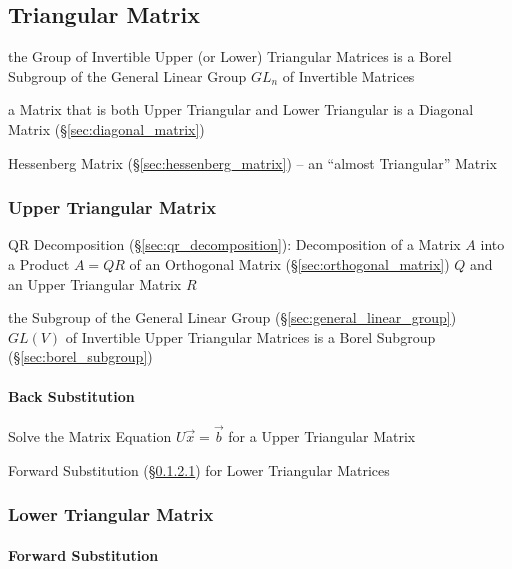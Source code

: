\subsection{Triangular Matrix}\label{sec:triangular_matrix}

the Group of Invertible Upper (or Lower) Triangular Matrices is a Borel
Subgroup of the General Linear Group $GL_n$ of Invertible Matrices

a Matrix that is both Upper Triangular and Lower Triangular is a Diagonal
Matrix (\S\ref{sec:diagonal_matrix})

\fist Hessenberg Matrix (\S\ref{sec:hessenberg_matrix}) -- an ``almost
Triangular'' Matrix



\subsubsection{Upper Triangular Matrix}\label{sec:upper_triangular}

QR Decomposition (\S\ref{sec:qr_decomposition}): Decomposition of a Matrix $A$
into a Product $A = QR$ of an Orthogonal Matrix (\S\ref{sec:orthogonal_matrix})
$Q$ and an Upper Triangular Matrix $R$

the Subgroup of the General Linear Group (\S\ref{sec:general_linear_group})
$GL(V)$ of Invertible Upper Triangular Matrices is a Borel Subgroup
(\S\ref{sec:borel_subgroup})



\paragraph{Back Substitution}\label{sec:back_substitution}\hfill

Solve the Matrix Equation $U\vec{x} = \vec{b}$ for a Upper Triangular Matrix

\fist Forward Substitution (\S\ref{sec:forward_substitution}) for Lower
Triangular Matrices



\subsubsection{Lower Triangular Matrix}\label{sec:lower_triangular}

\paragraph{Forward Substitution}\label{sec:forward_substitution}\hfill

